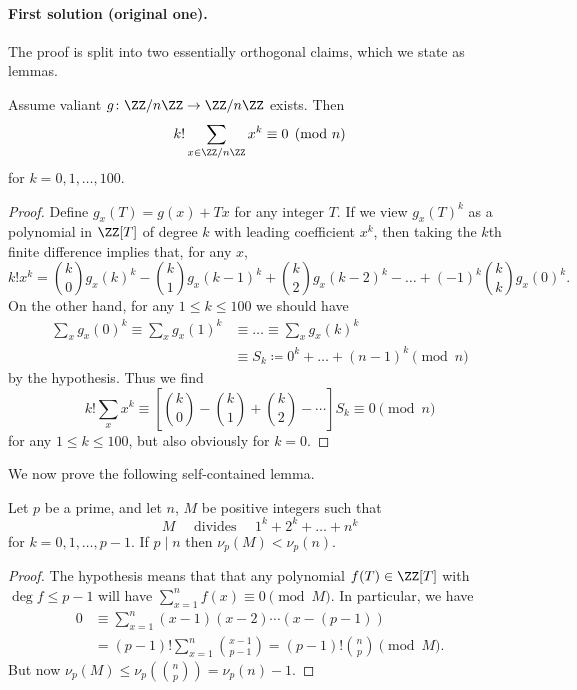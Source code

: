\documentclass[11pt]{scrartcl}
\begin{document}
\paragraph{First solution (original one).}
The proof is split into two essentially orthogonal claims,
which we state as lemmas.
\begin{lemma*}
  Assume valiant $g \colon \ZZ/n\ZZ \to \ZZ/n\ZZ$ exists.
  Then \[ k! \sum_{x \in \ZZ/n\ZZ} x^k \equiv 0 \pmod{n} \]
  for $k = 0, 1, \dots, 100$.
\end{lemma*}

\begin{proof}
  Define $g_x(T) = g(x) + Tx$ for any integer $T$.
  If we view $g_x(T)^k$
  as a polynomial in $\ZZ[T]$ of degree $k$
  with leading coefficient $x^k$,
  then taking the $k$th finite difference implies that,
  for any $x$,
  \[ k! x^k = \binom k0 g_x(k)^k
    - \binom k1 g_x(k-1)^k  + \binom k2 g_x(k-2)^k - \dots
    + (-1)^k \binom kk g_x(0)^k.  \]
  On the other hand, for any $1 \le k \le 100$
  we should have
  \begin{align*}
    \sum_x g_x(0)^k \equiv \sum_x g_x(1)^k
    &\equiv \dots \equiv \sum_x g_x(k)^k \\
    &\equiv S_k \coloneqq 0^k + \dots + (n-1)^k \pmod n
  \end{align*}
  by the hypothesis.
  Thus we find
  \[ k! \sum_x x^k
    \equiv \left[ \binom k0 - \binom k1 + \binom k2 - \dotsb \right] S_k
    \equiv 0 \pmod n \]
  for any $1 \le k \le 100$, but also obviously for $k = 0$.
\end{proof}

We now prove the following self-contained lemma.
\begin{lemma*}
  Let $p$ be a prime, and let $n$, $M$ be positive integers such that
  \[ M \quad\text{ divides }\quad 1^k + 2^k + \dots + n^k \]
  for $k = 0, 1, \dots, p-1$.
  If $p \mid n$ then $\nu_p(M) < \nu_p(n)$.
\end{lemma*}

\begin{proof}
  The hypothesis means that
  that any polynomial $f(T) \in \ZZ[T]$
  with $\deg f \le p-1$ will have $\sum_{x=1}^n f(x) \equiv 0 \pmod{M}$.
  In particular, we have
  \begin{align*}
    0 &\equiv \sum_{x=1}^n (x-1)(x-2) \dotsm (x-(p-1)) \\
    &= (p-1)! \sum_{x=1}^{n} \binom{x-1}{p-1}
    = (p-1)! \binom np \pmod{M}.
  \end{align*}
  But now $\nu_p(M) \le \nu_p(\binom np) = \nu_p(n) - 1$.
\end{proof}
\end{document}
